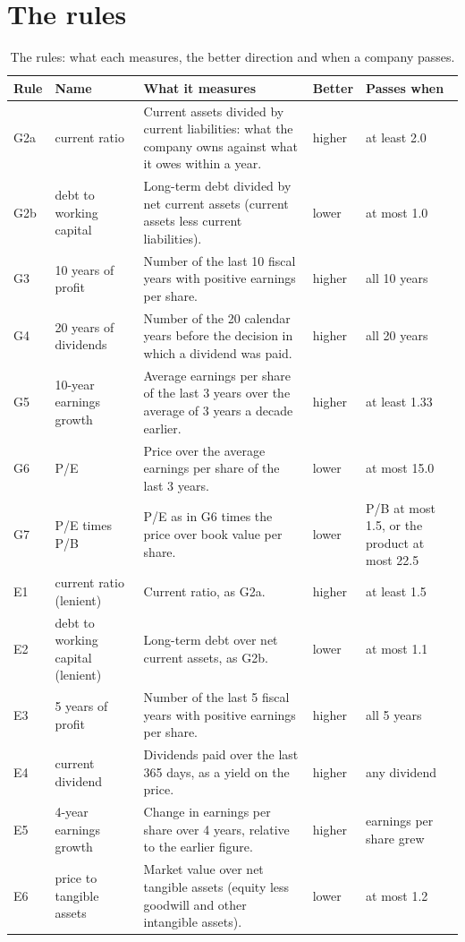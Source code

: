 \documentclass[11pt,a4paper]{article}
\begin{document}
\section{The rules}
\label{app:rules}
\begin{table}[H]
\centering
\small
\caption{The rules: what each measures, the better direction and when a company passes.}\label{tab:rules}
\begin{tabular}{l p{2.2cm} p{5.2cm} l p{2.8cm}}
\hline
Rule & Name & What it measures & Better & Passes when \\
\hline
G2a & current ratio & Current assets divided by current liabilities: what the company owns against what it owes within a year. & higher & at least 2.0 \\
G2b & debt to working capital & Long-term debt divided by net current assets (current assets less current liabilities). & lower & at most 1.0 \\
G3 & 10 years of profit & Number of the last 10 fiscal years with positive earnings per share. & higher & all 10 years \\
G4 & 20 years of dividends & Number of the 20 calendar years before the decision in which a dividend was paid. & higher & all 20 years \\
G5 & 10-year earnings growth & Average earnings per share of the last 3 years over the average of 3 years a decade earlier. & higher & at least 1.33 \\
G6 & P/E & Price over the average earnings per share of the last 3 years. & lower & at most 15.0 \\
G7 & P/E times P/B & P/E as in G6 times the price over book value per share. & lower & P/B at most 1.5, or the product at most 22.5 \\
E1 & current ratio (lenient) & Current ratio, as G2a. & higher & at least 1.5 \\
E2 & debt to working capital (lenient) & Long-term debt over net current assets, as G2b. & lower & at most 1.1 \\
E3 & 5 years of profit & Number of the last 5 fiscal years with positive earnings per share. & higher & all 5 years \\
E4 & current dividend & Dividends paid over the last 365 days, as a yield on the price. & higher & any dividend \\
E5 & 4-year earnings growth & Change in earnings per share over 4 years, relative to the earlier figure. & higher & earnings per share grew \\
E6 & price to tangible assets & Market value over net tangible assets (equity less goodwill and other intangible assets). & lower & at most 1.2 \\

\end{tabular}
\end{table}
\end{document}

